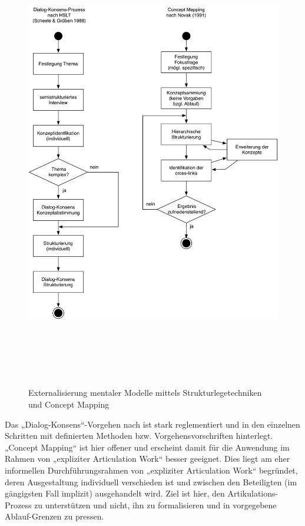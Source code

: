 \begin{figure}[htbp]
	\centering
		\includegraphics[height=20cm]{img/MentaleModelle/slt_cm.png}
	\caption{Externalisierung mentaler Modelle mittels Strukturlegetechniken und Concept Mapping}
	\label{fig:img_MentaleModelle_slt_cm}
\end{figure}

Das „Dialog-Konsens“-Vorgehen nach \citet{Scheele88} ist stark reglementiert und in den einzelnen Schritten mit definierten Methoden bzw. Vorgehensvorschriften hinterlegt. „Concept Mapping“ ist hier offener und erscheint damit für die Anwendung im Rahmen von „expliziter Articulation Work“ besser geeignet. Dies liegt am eher informellen Durchführungsrahmen von „expliziter Articulation Work“ begründet, deren Ausgestaltung individuell verschieden ist und zwischen den Beteiligten (im gängigsten Fall implizit) ausgehandelt wird. Ziel ist hier, den Artikulations-Prozess zu unterstützen und nicht, ihn zu formalisieren und in vorgegebene Ablauf-Grenzen zu pressen. 

